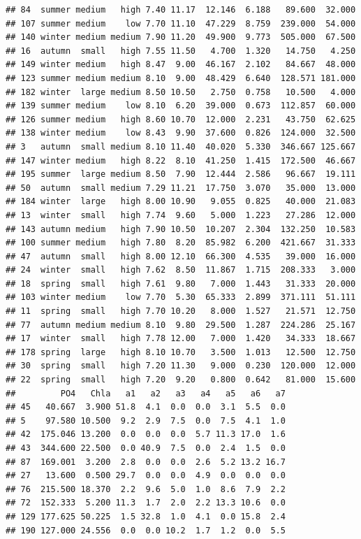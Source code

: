 \documentclass[]{report}
\begin{document}
\begin{verbatim}
## 84  summer medium   high 7.40 11.17  12.146  6.188   89.600  32.000
## 107 summer medium    low 7.70 11.10  47.229  8.759  239.000  54.000
## 140 winter medium medium 7.90 11.20  49.900  9.773  505.000  67.500
## 16  autumn  small   high 7.55 11.50   4.700  1.320   14.750   4.250
## 149 winter medium   high 8.47  9.00  46.167  2.102   84.667  48.000
## 123 summer medium medium 8.10  9.00  48.429  6.640  128.571 181.000
## 182 winter  large medium 8.50 10.50   2.750  0.758   10.500   4.000
## 139 summer medium    low 8.10  6.20  39.000  0.673  112.857  60.000
## 126 summer medium   high 8.60 10.70  12.000  2.231   43.750  62.625
## 138 winter medium    low 8.43  9.90  37.600  0.826  124.000  32.500
## 3   autumn  small medium 8.10 11.40  40.020  5.330  346.667 125.667
## 147 winter medium   high 8.22  8.10  41.250  1.415  172.500  46.667
## 195 summer  large medium 8.50  7.90  12.444  2.586   96.667  19.111
## 50  autumn  small medium 7.29 11.21  17.750  3.070   35.000  13.000
## 184 winter  large   high 8.00 10.90   9.055  0.825   40.000  21.083
## 13  winter  small   high 7.74  9.60   5.000  1.223   27.286  12.000
## 143 autumn medium   high 7.90 10.50  10.207  2.304  132.250  10.583
## 100 summer medium   high 7.80  8.20  85.982  6.200  421.667  31.333
## 47  autumn  small   high 8.00 12.10  66.300  4.535   39.000  16.000
## 24  winter  small   high 7.62  8.50  11.867  1.715  208.333   3.000
## 18  spring  small   high 7.61  9.80   7.000  1.443   31.333  20.000
## 103 winter medium    low 7.70  5.30  65.333  2.899  371.111  51.111
## 11  spring  small   high 7.70 10.20   8.000  1.527   21.571  12.750
## 77  autumn medium medium 8.10  9.80  29.500  1.287  224.286  25.167
## 17  winter  small   high 7.78 12.00   7.000  1.420   34.333  18.667
## 178 spring  large   high 8.10 10.70   3.500  1.013   12.500  12.750
## 30  spring  small   high 7.20 11.30   9.000  0.230  120.000  12.000
## 22  spring  small   high 7.20  9.20   0.800  0.642   81.000  15.600
##         PO4   Chla   a1   a2   a3   a4   a5   a6   a7
## 45   40.667  3.900 51.8  4.1  0.0  0.0  3.1  5.5  0.0
## 5    97.580 10.500  9.2  2.9  7.5  0.0  7.5  4.1  1.0
## 42  175.046 13.200  0.0  0.0  0.0  5.7 11.3 17.0  1.6
## 43  344.600 22.500  0.0 40.9  7.5  0.0  2.4  1.5  0.0
## 87  169.001  3.200  2.8  0.0  0.0  2.6  5.2 13.2 16.7
## 27   13.600  0.500 29.7  0.0  0.0  4.9  0.0  0.0  0.0
## 76  215.500 18.370  2.2  9.6  5.0  1.0  8.6  7.9  2.2
## 72  152.333  5.200 11.3  1.7  2.0  2.2 13.3 10.6  0.0
## 129 177.625 50.225  1.5 32.8  1.0  4.1  0.0 15.8  2.4
## 190 127.000 24.556  0.0  0.0 10.2  1.7  1.2  0.0  5.5

\end{verbatim}
\end{document}
